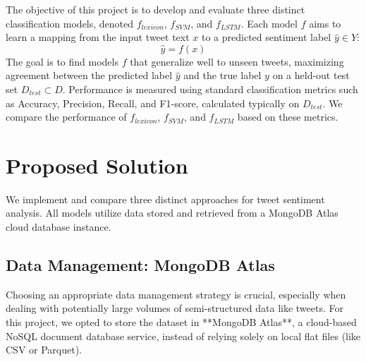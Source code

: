 \documentclass[10pt,twocolumn]{article}
\begin{document}
The objective of this project is to develop and evaluate three distinct classification models, denoted $f_{lexicon}$, $f_{SVM}$, and $f_{LSTM}$. Each model $f$ aims to learn a mapping from the input tweet text $x$ to a predicted sentiment label $\hat{y} \in Y$:
$$ \hat{y} = f(x) $$
The goal is to find models $f$ that generalize well to unseen tweets, maximizing agreement between the predicted label $\hat{y}$ and the true label $y$ on a held-out test set $D_{test} \subset D$. Performance is measured using standard classification metrics such as Accuracy, Precision, Recall, and F1-score, calculated typically on $D_{test}$. We compare the performance of $f_{lexicon}$, $f_{SVM}$, and $f_{LSTM}$ based on these metrics.

\section{Proposed Solution}
\label{sec:solution}

We implement and compare three distinct approaches for tweet sentiment analysis. All models utilize data stored and retrieved from a MongoDB Atlas cloud database instance.

\subsection{Data Management: MongoDB Atlas}
\label{subsec:data_management}

Choosing an appropriate data management strategy is crucial, especially when dealing with potentially large volumes of semi-structured data like tweets. For this project, we opted to store the dataset in **MongoDB Atlas**, a cloud-based NoSQL document database service, instead of relying solely on local flat files (like CSV or Parquet).
\end{document}
